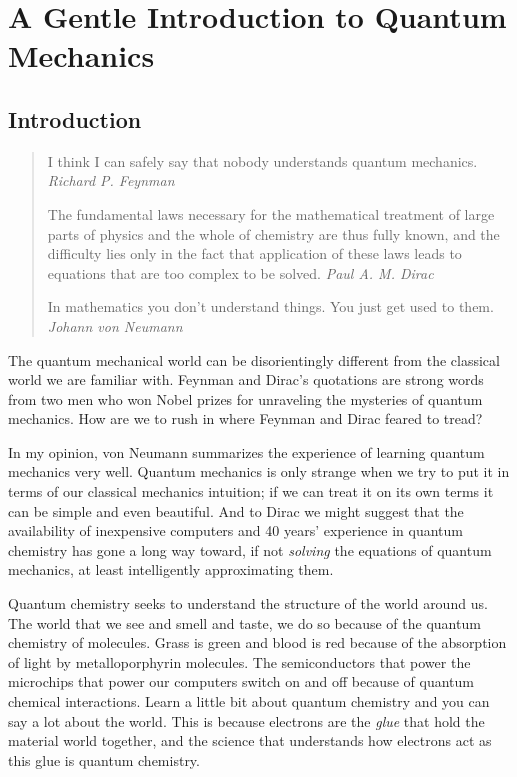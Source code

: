 \chapter{A Gentle Introduction to Quantum Mechanics}

\graphicspath{{./Figures/Introduction/}}

\section{Introduction}
\begin{quote}
I think I can safely say that nobody understands quantum
mechanics. 
\emph{Richard P. Feynman}

The fundamental laws necessary for the mathematical
treatment of large parts of physics and the whole of chemistry are
thus fully known, and the difficulty lies only in the fact that
application of these laws leads to equations that are too complex to
be solved.
\emph{Paul A. M. Dirac}

In mathematics you don't understand things. You just get used to them.
\emph{Johann von Neumann}
\end{quote}

\noindent The quantum mechanical world can be disorientingly different
from the classical world we are familiar with. Feynman and Dirac's
quotations are strong words from two men who won Nobel prizes for
unraveling the mysteries of quantum mechanics. How are we to rush in
where Feynman and Dirac feared to tread? 

In my opinion, von Neumann summarizes the experience of
learning quantum mechanics very well. Quantum mechanics is only
strange when we try to put it in terms of our classical mechanics
intuition; if we can treat it on its own terms it can be simple and
even beautiful. And to Dirac we might suggest that the availability of
inexpensive computers and 40 years' experience in quantum chemistry
has gone a long way toward, if not \emph{solving} the equations of
quantum mechanics, at least intelligently approximating them.

Quantum chemistry seeks to understand the structure of the world
around us. The world that we see and smell and taste, we do so because
of the quantum chemistry of molecules. Grass is green and blood is
red because of the absorption of light by metalloporphyrin
molecules. The semiconductors that power the microchips that power our
computers switch on and off because of quantum chemical
interactions. Learn a little bit about quantum chemistry and you can
say a lot about the world. This is because electrons are the
\emph{glue} that hold the material world together, and the science
that understands how electrons act as this glue is quantum chemistry.


